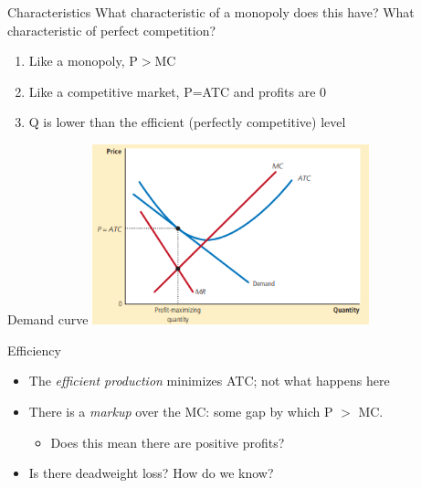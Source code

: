 \documentclass[aspectratio=169]{beamer}
\begin{document}
\begin{frame}{Characteristics}
    What characteristic of a monopoly does this have? What characteristic of perfect competition?
    \begin{enumerate}
        \item Like a monopoly, P$>$MC
        \item Like a competitive market, P=ATC and profits are 0
        \item Q is lower than the efficient (perfectly competitive) level
    \end{enumerate}
\end{frame}

\begin{frame}{Demand curve}
    \centering
    \includegraphics[width = 0.6\textwidth,keepaspectratio]{MCeq.png}
\end{frame}

\begin{frame}{Efficiency}
    \begin{itemize}
        \item The \textit{efficient production} minimizes ATC; not what happens here
        \item There is a \textit{markup} over the MC: some gap by which P $>$ MC.
        \begin{itemize}
            \item Does this mean there are positive profits?
        \end{itemize} 
        \item Is there deadweight loss? How do we know?
    \end{itemize}
\end{frame}
\end{document}
